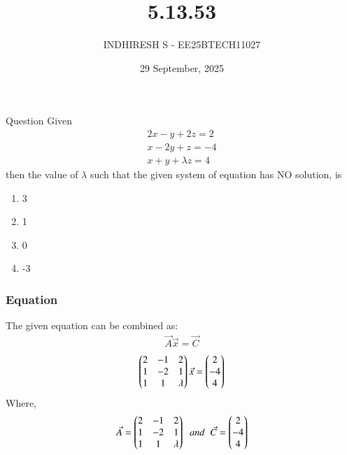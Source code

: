 \documentclass{beamer}
\title %
    {5.13.53}
\date{29 September, 2025}
\author %
    {INDHIRESH S - EE25BTECH11027}
\begin{document}
    
    \frame{\titlepage}
    
    \begin{frame}{Question}
     Given
\begin{align*}
    2x - y + 2z = 2\\
    x - 2y + z = -4\\
    x + y + \lambda z = 4
\end{align*}
then the value of $\lambda$ such that the given system of equation has NO solution, is
\begin{enumerate}
    \item 3
    \item 1
    \item 0
    \item -3
\end{enumerate}
    \end{frame}
    
    \begin{frame}[allowframebreaks] 
    \frametitle{Equation}
        \centering
        \label{tab:parameters}
   The given equation can be combined as:
\begin{align}
    \Vec{A}\Vec{x}=\Vec{C}
\end{align}
\begin{align}
  \begin{pmatrix}2&-1&2\\1&-2&1\\1&1&\lambda\end{pmatrix}\Vec{x}=\begin{pmatrix}2\\-4\\4\end{pmatrix}
\end{align}
Where,
\begin{align}
   \Vec{A}=\begin{pmatrix}2&-1&2\\1&-2&1\\1&1&\lambda\end{pmatrix}\;\;and\;\;\Vec{C}=\begin{pmatrix}2\\-4\\4\end{pmatrix}
\end{align}

    \end{frame}
    
\end{document}
